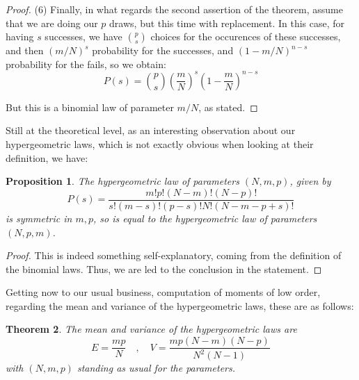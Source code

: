 \documentclass[12pt]{amsbook}
\newtheorem{theorem}{Theorem}[chapter]
\newtheorem{proposition}[theorem]{Proposition}
\begin{document}
\begin{proof}
(6) Finally, in what regards the second assertion of the theorem, assume that we are doing our $p$ draws, but this time with replacement. In this case, for having $s$ successes, we have $\binom{p}{s}$ choices for the occurences of these successes, and then $(m/N)^s$ probability for the successes, and $(1-m/N)^{n-s}$ probability for the fails, so we obtain:
$$P(s)=\binom{p}{s}\left(\frac{m}{N}\right)^s\left(1-\frac{m}{N}\right)^{n-s}$$

But this is a binomial law of parameter $m/N$, as stated.
\end{proof}

Still at the theoretical level, as an interesting observation about our hypergeometric laws, which is not exactly obvious when looking at their definition, we have:

\begin{proposition}
The hypergeometric law of parameters $(N,m,p)$, given by
$$P(s)=\frac{m!p!(N-m)!(N-p)!}{s!(m-s)!(p-s)!N!(N-m-p+s)!}$$
is symmetric in $m,p$, so is equal to the hypergeometric law of parameters $(N,p,m)$.
\end{proposition}

\begin{proof}
This is indeed something self-explanatory, coming from the definition of the binomial laws. Thus, we are led to the conclusion in the statement.
\end{proof}

Getting now to our usual business, computation of moments of low order, regarding the mean and variance of the hypergeometric laws, these are as follows:

\begin{theorem}
The mean and variance of the hypergeometric laws are
$$E=\frac{mp}{N}\quad,\quad V=\frac{mp(N-m)(N-p)}{N^2(N-1)}$$
with $(N,m,p)$ standing as usual for the parameters.
\end{theorem}
\end{document}
